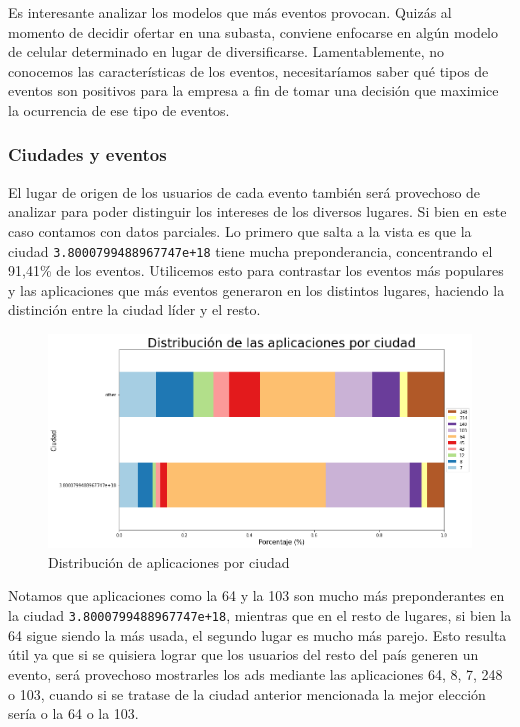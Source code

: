 \documentclass[a4paper, 12pt]{article}
\begin{document}
    Es interesante analizar los modelos que más eventos provocan. Quizás al momento de decidir ofertar
    en una subasta, conviene enfocarse en algún modelo de celular determinado en lugar de diversificarse. Lamentablemente,
    no conocemos las características de los eventos, necesitaríamos saber qué tipos de eventos son positivos para la empresa a fin
    de tomar una decisión que maximice la ocurrencia de ese tipo de eventos.

	\subsubsection{Ciudades y eventos}
		El lugar de origen de los usuarios de cada evento también será provechoso de analizar para poder distinguir los intereses de los diversos lugares. Si bien en este caso contamos con datos parciales. Lo primero que salta a la vista es que la ciudad \texttt{3.8000799488967747e+18} tiene mucha preponderancia, concentrando el 91,41\% de los eventos. Utilicemos esto para contrastar los eventos más populares y las aplicaciones que más eventos generaron en los distintos lugares, haciendo la distinción entre la ciudad líder y el resto.

		\FloatBarrier
		\begin{figure}[h]
			\centering
			\includegraphics[width=\textwidth]{images/events/citiapp.png}
			\caption{Distribución de aplicaciones por ciudad}
		\end{figure}
		\FloatBarrier

		Notamos que aplicaciones como la 64 y la 103 son mucho más preponderantes en la ciudad \texttt{3.8000799488967747e+18},
		mientras que en el resto de lugares, si bien la 64 sigue siendo la más usada, el segundo lugar es mucho más parejo. Esto resulta útil ya que si se quisiera lograr que los usuarios del resto del país generen un evento, será provechoso mostrarles los ads mediante las aplicaciones 64, 8, 7, 248 o 103, cuando si se tratase de la ciudad anterior mencionada la mejor elección sería o la 64 o la 103.
\end{document}
